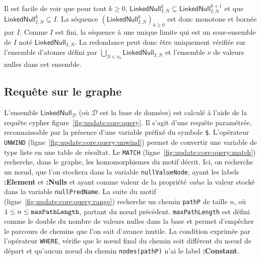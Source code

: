 Il est facile de voir que pour tout $k \geq 0$, $\textsf{LinkedNull}^k_{I,N} \subseteq \textsf{LinkedNull}^{k+1}_{I,N}$ et que $\textsf{LinkedNull}^k_{I,N} \subseteq I$.
La séquence $(\textsf{LinkedNull}^k_{I,N})_{k \ge 0}$ est donc monotone et bornée par $I$.
Comme $I$ est fini, la séquence à une unique limite qui est un sous-ensemble de $I$ noté $\textsf{LinkedNull}_{I,N}$.
La redondance peut donc être uniquement vérifiée sur l'ensemble d'atomes défini par $\bigcup_{N \in \nu_0}\textsf{LinkedNull}_{I,N}$ et l'ensemble $\nu$ de valeurs nulles dans cet ensemble.

\subsection{Requête sur le graphe}
L'ensemble $\textsf{LinkedNull}_{\mathcal{D}}$ (où $\mathcal{D}$ est la base de données) est calculé à l'aide de la requête \gls{cypher} figure~\ref{fig:update:core:query}.
Il s'agit d'une requête paramétrée, reconnaissable par la présence d'une variable préfixé du symbole \verb|$|.
L'opérateur \verb|UNWIND| (ligne~\ref{fig:update:core:query:unwind}) permet de convertir une variable de type liste en une table de résultat.
Le \verb|MATCH| (ligne~\ref{fig:update:core:query:match}) recherche, dans le graphe, les homomorphismes du motif décrit.
Ici, on recherche un nœud, que l'on stockera dans la variable \verb|nullValueNode|, ayant les labels \textbf{:Element} et \textbf{:Nulls} et ayant comme valeur de la propriété \textit{value} la valeur stocké dans la variable \verb|nullPredName|.
La suite du motif (ligne~\ref{fig:update:core:query:range}) recherche un chemin \verb|pathP| de taille $n$, où $1 \leq n \leq \verb|maxPathLength|$, partant du nœud précédent.
\verb|maxPathLength| est défini comme le double du nombre de valeurs nulles dans la base et permet d'empêcher le parcours de chemins que l'on sait d'avance inutile.
La condition exprimée par l'opérateur \verb|WHERE|, vérifie que le nœud final du chemin soit différent du nœud de départ et qu'aucun nœud du chemin \verb|nodes(pathP)| n'ai le label \textbf{:Constant}.

